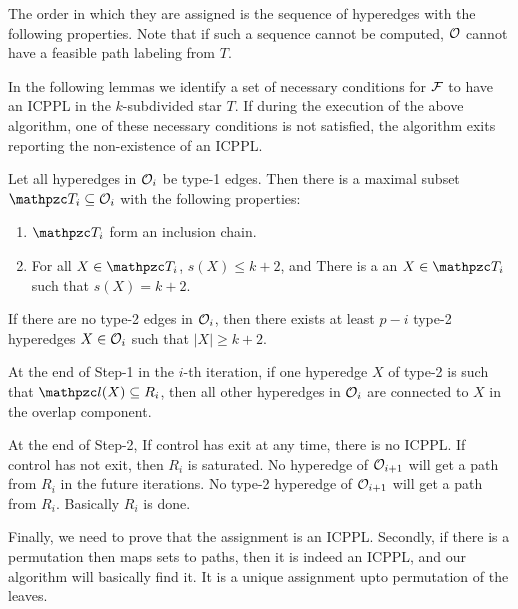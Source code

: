 \documentclass[MS]             %
              {iitmdiss_as}    %
\begin{document}
\noindent
The order in which they are assigned is the sequence of hyperedges
with the following properties. Note that if such a sequence cannot be
computed, ${\cal O}$ cannot have a feasible path labeling from $T$.

\noindent
{} In the following
lemmas we identify a set of necessary conditions for ${\cal F}$ to have an
ICPPL in the $k$-subdivided star $T$.  If during the execution of the
above algorithm, one of these necessary conditions is not satisfied,
the algorithm exits reporting the non-existence of an ICPPL.
\begin{lemma}
  Let all hyperedges in ${\cal O}_i$ be type-1 edges.  Then there is a
  maximal subset $\ccT_i \subseteq \cO_i$ with the following
  properties:
  \begin{enumerate}
  \item $\ccT_i$ form an inclusion chain.
  \item For all $X \in \ccT_i$, $s(X) \leq k+2$, and There is a an $X
    \in \ccT_i$ such that $s(X)=k+2$.
  \end{enumerate}
\end{lemma}
\begin{lemma}
  If there are no \marginal type-2 edges in ${\cal O}_i$, then there exists
  at least $p-i$ type-2 hyperedges $X \in {\cal O}_i$ such that $|X| \geq
  k+2$.
\end{lemma}
\begin{lemma}
  At the end of Step-1 in the $i$-th iteration, if one hyperedge $X$
  of type-2 is such that $\cl(X) \subseteq R_i$, then all other
  hyperedges in ${\cal O}_i$ are connected to $X$ in the overlap component.
\end{lemma}
\begin{lemma}
  At the end of Step-2, If control has exit at any time, there is no
  ICPPL. If control has not exit, then $R_i$ is saturated.  No
  hyperedge of ${\cal O}_{i+1}$ will get a path from $R_i$ in the future
  iterations.  No type-2 hyperedge of ${\cal O}_{i+1}$ will get a path from
  $R_i$.  Basically $R_i$ is done.
\end{lemma}
\begin{lemma}
  Finally, we need to prove that the assignment is an ICPPL. Secondly,
  if there is a permutation then maps sets to paths, then it is indeed
  an ICPPL, and our algorithm will basically find it.  It is a unique
  assignment upto permutation of the leaves.
\end{lemma}
\end{document}
